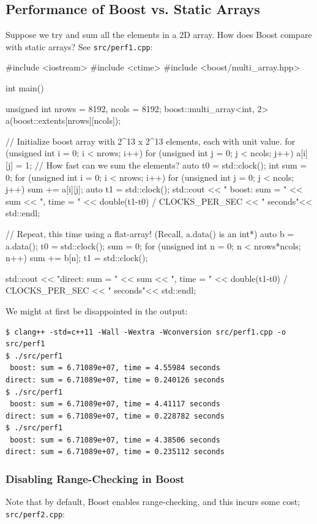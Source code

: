 \documentclass[12pt,letterpaper,twoside]{article}
\begin{document}
\subsection{Performance of Boost vs. Static Arrays}
Suppose we try and sum all the elements in a 2D array. How does Boost compare with static arrays?
See \texttt{src/perf1.cpp}:

\begin{cpp}
#include <iostream>
#include <ctime>
#include <boost/multi_array.hpp>

int main() {
  unsigned int nrows = 8192, ncols = 8192;
  boost::multi_array<int, 2> a(boost::extents[nrows][ncols]);

  // Initialize boost array with 2^13 x 2^13 elements, each with unit value.
  for (unsigned int i = 0; i < nrows; i++)
    for (unsigned int j = 0; j < ncols; j++)
      a[i][j] = 1;
  // How fast can we sum the elements?
  auto t0 = std::clock();
  int sum = 0;
  for (unsigned int i = 0; i < nrows; i++)
    for (unsigned int j = 0; j < ncols; j++)
      sum += a[i][j];
  auto t1 = std::clock();
  std::cout << " boost: sum = " << sum << ", time = "
            << double(t1-t0) / CLOCKS_PER_SEC
            << " seconds"<< std::endl;

  // Repeat, this time using a flat-array! (Recall, a.data() is an int*)
  auto b = a.data();
  t0 = std::clock();
  sum = 0;
  for (unsigned int n = 0; n < nrows*ncols; n++)
    sum += b[n];
  t1 = std::clock();

  std::cout << "direct: sum = " << sum << ", time = "
            << double(t1-t0) / CLOCKS_PER_SEC
            << " seconds"<< std::endl;
}
\end{cpp}

We might at first be disappointed in the output:

{\small
\begin{verbatim}
$ clang++ -std=c++11 -Wall -Wextra -Wconversion src/perf1.cpp -o src/perf1
$ ./src/perf1
 boost: sum = 6.71089e+07, time = 4.55984 seconds
direct: sum = 6.71089e+07, time = 0.240126 seconds
$ ./src/perf1
 boost: sum = 6.71089e+07, time = 4.41117 seconds
direct: sum = 6.71089e+07, time = 0.228782 seconds
$ ./src/perf1
 boost: sum = 6.71089e+07, time = 4.38506 seconds
direct: sum = 6.71089e+07, time = 0.235112 seconds
\end{verbatim}
}

\subsubsection{Disabling Range-Checking in Boost}
Note that by default, Boost enables range-checking, and this incurs some cost;
\texttt{src/perf2.cpp}:
\end{document}
